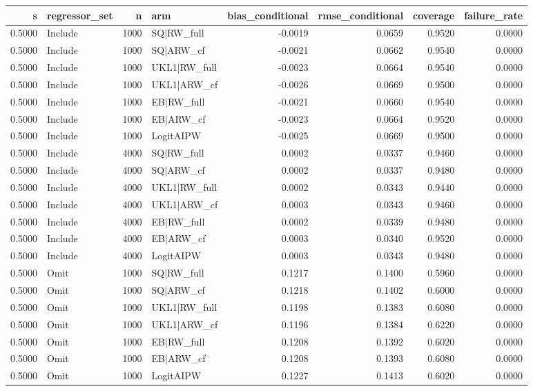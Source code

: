 \begin{tabular}{rlrlrrrr}
\toprule
s & regressor\_set & n & arm & bias\_conditional & rmse\_conditional & coverage & failure\_rate \\
\midrule
0.5000 & Include & 1000 & SQ|RW\_full & -0.0019 & 0.0659 & 0.9520 & 0.0000 \\
0.5000 & Include & 1000 & SQ|ARW\_cf & -0.0021 & 0.0662 & 0.9540 & 0.0000 \\
0.5000 & Include & 1000 & UKL1|RW\_full & -0.0023 & 0.0664 & 0.9540 & 0.0000 \\
0.5000 & Include & 1000 & UKL1|ARW\_cf & -0.0026 & 0.0669 & 0.9500 & 0.0000 \\
0.5000 & Include & 1000 & EB|RW\_full & -0.0021 & 0.0660 & 0.9540 & 0.0000 \\
0.5000 & Include & 1000 & EB|ARW\_cf & -0.0023 & 0.0664 & 0.9520 & 0.0000 \\
0.5000 & Include & 1000 & LogitAIPW & -0.0025 & 0.0669 & 0.9500 & 0.0000 \\
0.5000 & Include & 4000 & SQ|RW\_full & 0.0002 & 0.0337 & 0.9460 & 0.0000 \\
0.5000 & Include & 4000 & SQ|ARW\_cf & 0.0002 & 0.0337 & 0.9480 & 0.0000 \\
0.5000 & Include & 4000 & UKL1|RW\_full & 0.0002 & 0.0343 & 0.9440 & 0.0000 \\
0.5000 & Include & 4000 & UKL1|ARW\_cf & 0.0003 & 0.0343 & 0.9460 & 0.0000 \\
0.5000 & Include & 4000 & EB|RW\_full & 0.0002 & 0.0339 & 0.9480 & 0.0000 \\
0.5000 & Include & 4000 & EB|ARW\_cf & 0.0003 & 0.0340 & 0.9520 & 0.0000 \\
0.5000 & Include & 4000 & LogitAIPW & 0.0003 & 0.0343 & 0.9480 & 0.0000 \\
0.5000 & Omit & 1000 & SQ|RW\_full & 0.1217 & 0.1400 & 0.5960 & 0.0000 \\
0.5000 & Omit & 1000 & SQ|ARW\_cf & 0.1218 & 0.1402 & 0.6000 & 0.0000 \\
0.5000 & Omit & 1000 & UKL1|RW\_full & 0.1198 & 0.1383 & 0.6080 & 0.0000 \\
0.5000 & Omit & 1000 & UKL1|ARW\_cf & 0.1196 & 0.1384 & 0.6220 & 0.0000 \\
0.5000 & Omit & 1000 & EB|RW\_full & 0.1208 & 0.1392 & 0.6020 & 0.0000 \\
0.5000 & Omit & 1000 & EB|ARW\_cf & 0.1208 & 0.1393 & 0.6080 & 0.0000 \\
0.5000 & Omit & 1000 & LogitAIPW & 0.1227 & 0.1413 & 0.6020 & 0.0000 \\

\end{tabular}
